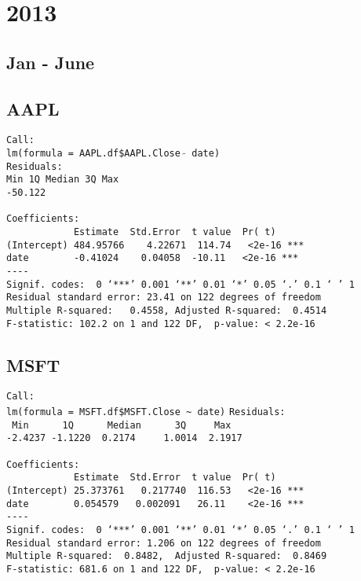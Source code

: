 \documentclass{article}[14pt]
\begin{document}
\section{ 2013}

\subsection{Jan - June}
\subsection{AAPL}

\texttt{Call: \\
lm(formula = AAPL.df\$AAPL.Close $\tilde{}$ date)\\
Residuals:\\
Min \hspace{35pt} 1Q \qquad Median \qquad 3Q \qquad  Max\\
-50.122       \\}
\verb| |\\
\verb|Coefficients:|\\
\verb|            Estimate  Std.Error  t value  Pr( t)|\\
\verb|(Intercept) 484.95766    4.22671  114.74   <2e-16 ***|\\
\verb|date        -0.41024    0.04058  -10.11   <2e-16 ***|\\
\verb|----|\\
\verb|Signif. codes:  0 ‘***’ 0.001 ‘**’ 0.01 ‘*’ 0.05 ‘.’ 0.1 ‘ ’ 1|\\
\verb|Residual standard error: 23.41 on 122 degrees of freedom|\\
\verb|Multiple R-squared:   0.4558,	Adjusted R-squared:  0.4514|\\
\verb|F-statistic: 102.2 on 1 and 122 DF,  p-value: < 2.2e-16|

\subsection{MSFT}
\verb|Call:|\\
\verb|lm(formula = MSFT.df$MSFT.Close ~ date)|
\verb|Residuals:|\\
\verb| Min      1Q      Median      3Q     Max |\\
\verb|-2.4237 -1.1220  0.2174     1.0014  2.1917|\\
\verb| |\\
\verb|Coefficients:|\\
\verb|            Estimate  Std.Error  t value  Pr( t)|\\
\verb|(Intercept) 25.373761   0.217740  116.53   <2e-16 ***|\\
\verb|date        0.054579   0.002091   26.11    <2e-16 ***|\\
\verb|----|\\
\verb|Signif. codes:  0 ‘***’ 0.001 ‘**’ 0.01 ‘*’ 0.05 ‘.’ 0.1 ‘ ’ 1|\\
\verb|Residual standard error: 1.206 on 122 degrees of freedom|\\
\verb|Multiple R-squared:  0.8482,	Adjusted R-squared:  0.8469|\\
\verb|F-statistic: 681.6 on 1 and 122 DF,  p-value: < 2.2e-16|
\end{document}
